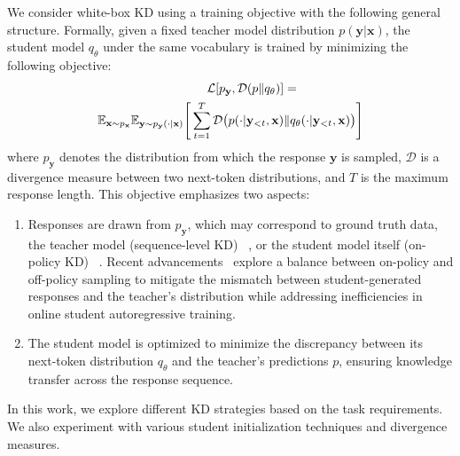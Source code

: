 We consider white-box KD using a training objective with the following general structure. Formally, given a fixed teacher model distribution $p(\mathbf{y}|\mathbf{x})$, the student model $q_\theta$ under the same vocabulary is trained by minimizing the following objective:
\begin{align}
\mathcal{L}[p_{\mathbf{y}}, \mathcal{D}(p \| q_\theta)] 
&= \\
\mathbb{E}_{\mathbf{x} \sim p_{\mathbf{x}}} \mathbb{E}_{\mathbf{y} \sim p_{\mathbf{y}}(\cdot|\mathbf{x})} \Bigg[ \sum_{t=1}^{T} \mathcal{D}\big(p(\cdot|\mathbf{y}_{<t}, \mathbf{x}) \notag & \| q_\theta(\cdot|\mathbf{y}_{<t}, \mathbf{x})\big) \Bigg]
\end{align}
where $p_{\mathbf{y}}$ denotes the distribution from which the response $\mathbf{y}$ is sampled, $\mathcal{D}$ is a divergence measure between two next-token distributions, and $T$ is the maximum response length. This objective emphasizes two aspects: 
\begin{enumerate}
  \item Responses are drawn from $p_{\mathbf{y}}$, which may correspond to ground truth data, the teacher model (sequence-level KD) ~\cite{kim2016sequence}, or the student model itself (on-policy KD) ~\cite{agarwal2024policy,gu2024minillm,zhou2023distillspec}. Recent advancements~\cite{xu2024speculative,ko2024distillm} explore a balance between on-policy and off-policy sampling to mitigate the mismatch between student-generated responses and the teacher’s distribution while addressing inefficiencies in online student autoregressive training.
  \item The student model is optimized to minimize the discrepancy between its next-token distribution $q_\theta$ and the teacher’s predictions $p$, ensuring knowledge transfer across the response sequence.
\end{enumerate}

In this work, we explore different KD strategies based on the task requirements. We also experiment with various student initialization techniques and divergence measures.

